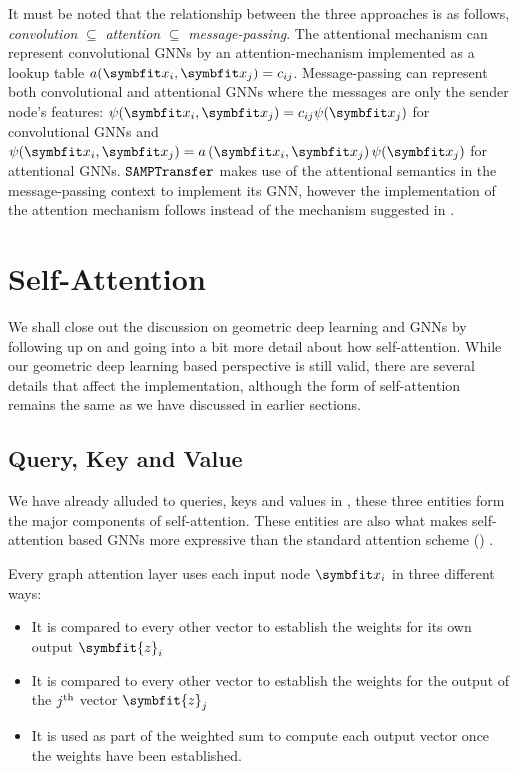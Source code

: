 It must be noted that the relationship between the three approaches is as follows, \textit{convolution} $\subseteq$ \textit{attention} $\subseteq$ \textit{message-passing}. The attentional mechanism can represent convolutional GNNs by an attention-mechanism implemented as a lookup table $a(\bfitx_i, \bfitx_j) = c_{ij}$. Message-passing can represent both convolutional and attentional GNNs where the messages are only the sender node's features: $\psi(\bfitx_i, \bfitx_j)=c_{ij}\psi(\bfitx_j)$ for convolutional GNNs and $\psi(\bfitx_i, \bfitx_j)=a\left(\bfitx_{i}, \bfitx_{j}\right)\psi(\bfitx_j)$ for attentional GNNs. $\texttt{SAMPTransfer}$ makes use of the attentional semantics in the message-passing context to implement its GNN, however the implementation of the attention mechanism follows \parencite{vaswani2017attention} instead of the mechanism suggested in \parencite{velic018graph}.

\section{Self-Attention}\label{sec:self-attention}

We shall close out the discussion on geometric deep learning and GNNs by following up on  and going into a bit more detail about how self-attention. While our geometric deep learning based perspective is still valid, there are several details that affect the implementation, although the form of self-attention remains the same as we have discussed in earlier sections.

\subsection{Query, Key and Value}\label{sec:attn-qkv}
We have already alluded to queries, keys and values in , these three entities form the major components of self-attention. These entities are also what makes self-attention based GNNs more expressive than the standard attention scheme () \parencite{brody2021attentive, Bronstein2021, Dwivedi2020}.

Every graph attention layer uses each input node $\bfitx_i$ in three different ways:
\begin{itemize}
    \item It is compared to every other vector to establish the weights for its own output $\symbfit{z}_i$
    \item It is compared to every other vector to establish the weights for the output of the $j\textsuperscript{th}$ vector $\symbfit{z}_j$
    \item It is used as part of the weighted sum to compute each output vector once the weights have been established.
\end{itemize}

